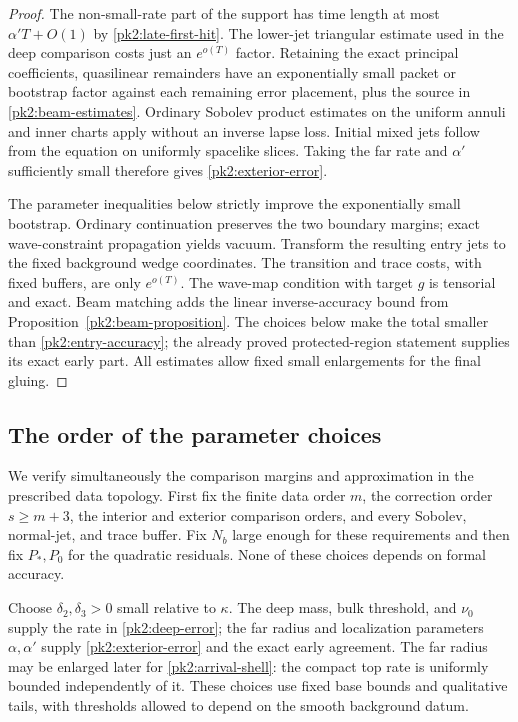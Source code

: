 \begin{proof}
The non-small-rate part of the support has time length at most
$\alpha'T+O(1)$ by \eqref{pk2:late-first-hit}. The lower-jet
triangular estimate used in the deep comparison costs just an
$e^{o(T)}$ factor. Retaining the exact principal coefficients,
quasilinear remainders have an exponentially small packet or
bootstrap factor against each remaining error placement, plus
the source in \eqref{pk2:beam-estimates}. Ordinary Sobolev product
estimates on the uniform annuli and inner charts apply without
an inverse lapse loss. Initial mixed jets follow from the equation
on uniformly spacelike slices. Taking the far rate and
$\alpha'$ sufficiently small therefore gives
\eqref{pk2:exterior-error}.

The parameter inequalities below strictly improve the exponentially
small bootstrap. Ordinary continuation preserves the two boundary
margins; exact wave-constraint propagation yields vacuum. Transform
the resulting entry jets to the fixed background wedge coordinates.
The transition and trace costs, with fixed buffers, are only
$e^{o(T)}$. The wave-map condition with target $g$ is tensorial and
exact. Beam matching adds the linear inverse-accuracy bound from
Proposition~\ref{pk2:beam-proposition}. The choices below make
the total smaller than \eqref{pk2:entry-accuracy}; the already
proved protected-region statement supplies its exact early part.
All estimates allow fixed small enlargements for the final gluing.
\end{proof}

\subsection{The order of the parameter choices}
\label{pk2:choices}

We verify simultaneously the comparison margins and approximation in
the prescribed data topology. First fix the finite data order $m$,
the correction order $s\ge m+3$, the interior and exterior comparison
orders, and every Sobolev, normal-jet, and trace buffer. Fix $N_b$
large enough for these requirements and then fix $P_*,P_0$ for the
quadratic residuals. None of these choices depends on formal accuracy.

Choose $\delta_2,\delta_3>0$ small relative to $\kappa$. The deep
mass, bulk threshold, and $\nu_0$ supply the rate in
\eqref{pk2:deep-error}; the far radius and localization parameters
$\alpha,\alpha'$ supply \eqref{pk2:exterior-error} and the exact
early agreement. The far radius may be enlarged later for
\eqref{pk2:arrival-shell}: the compact top rate is uniformly
bounded independently of it. These choices use fixed base bounds
and qualitative tails, with thresholds allowed to depend on the
smooth background datum.

